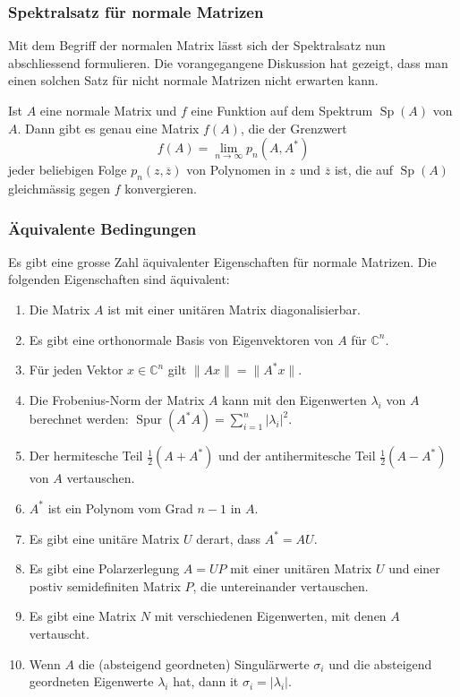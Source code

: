 \subsubsection{Spektralsatz für normale Matrizen}
Mit dem Begriff der normalen Matrix lässt sich der Spektralsatz nun
abschliessend formulieren.
Die vorangegangene Diskussion hat gezeigt, dass man einen solchen
Satz für nicht normale Matrizen nicht erwarten kann.

\begin{satz}
\label{buch:eigenwerte:satz:spektralnormal}
Ist $A$ eine normale Matrix und $f$ eine Funktion auf dem Spektrum
$\operatorname{Sp}(A)$ von $A$.
Dann gibt es genau eine Matrix $f(A)$, die der Grenzwert
\[
f(A)
=
\lim_{n\to\infty} p_n(A,A^*)
\]
jeder beliebigen
Folge $p_n(z,\overline{z})$ von Polynomen in $z$ und $\overline{z}$ ist,
die auf $\operatorname{Sp}(A)$ gleichmässig gegen $f$ konvergieren.
\end{satz}

\subsubsection{Äquivalente Bedingungen}
Es gibt eine grosse Zahl äquivalenter Eigenschaften für normale Matrizen.
Die folgenden Eigenschaften sind äquivalent:
\begin{enumerate}
\item
Die Matrix $A$ ist mit einer unitären Matrix diagonalisierbar.
\item
Es gibt eine orthonormale Basis von Eigenvektoren von $A$ für $\mathbb{C}^n$.
\item
Für jeden Vektor $x\in\mathbb{C}^n$ gilt $\|Ax\|=\|A^*x\|$.
\item
Die Frobenius-Norm der Matrix $A$ kann mit den Eigenwerten $\lambda_i$
%
von $A$ berechnet werden:
$\operatorname{Spur}(A^*A) = \sum_{i=1}^n |\lambda_i|^2$.
\item
Der hermitesche Teil $\frac12(A+A^*)$ und der antihermitesche Teil
$\frac12(A-A^*)$ von $A$ vertauschen.
%
%
\item
$A^*$ ist ein Polynom vom Grad $n-1$ in $A$.
\item
Es gibt eine unitäre Matrix $U$ derart, dass $A^*=AU$.
%
\item
Es gibt eine Polarzerlegung $A=UP$ mit einer unitären Matrix $U$ und
einer postiv semidefiniten Matrix $P$, die untereinander vertauschen.
\item
Es gibt eine Matrix $N$ mit verschiedenen Eigenwerten, mit denen $A$
vertauscht.
\item
Wenn $A$ die (absteigend geordneten) Singulärwerte $\sigma_i$ und
%
die absteigend geordneten Eigenwerte $\lambda_i$ hat,
dann it $\sigma_i=|\lambda_i|$.
\end{enumerate}




